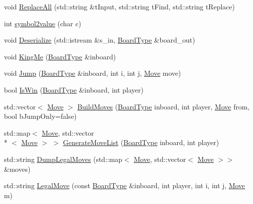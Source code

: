 \begin{DoxyCompactItemize}
\item 
void \hyperlink{structCheckers_1_1CheckersGame_a2c9facec3391246b7e501a5d8f960a5e}{Replace\-All} (std\-::string \&t\-Input, std\-::string t\-Find, std\-::string t\-Replace)
\item 
int \hyperlink{structCheckers_1_1CheckersGame_ac7e50da5e0c82db0cf66798587824aef}{symbol2value} (char c)
\item 
void \hyperlink{structCheckers_1_1CheckersGame_a9306065f944c32286cce8ad89e1d78d4}{Deserialize} (std\-::istream \&s\-\_\-in, \hyperlink{structCheckers_1_1BoardType}{Board\-Type} \&board\-\_\-out)
\item 
void \hyperlink{structCheckers_1_1CheckersGame_a9b9b1a25e9f43350f2e770152c7e290c}{King\-Me} (\hyperlink{structCheckers_1_1BoardType}{Board\-Type} \&inboard)
\item 
void \hyperlink{structCheckers_1_1CheckersGame_a4dbc105abdef75398282e442a453e31d}{Jump} (\hyperlink{structCheckers_1_1BoardType}{Board\-Type} \&inboard, int i, int j, \hyperlink{structCheckers_1_1Move}{Move} move)
\item 
bool \hyperlink{structCheckers_1_1CheckersGame_aca523dc54c4af9dfef6a31a19166c4f4}{Is\-Win} (\hyperlink{structCheckers_1_1BoardType}{Board\-Type} \&inboard, int player)
\item 
std\-::vector$<$ \hyperlink{structCheckers_1_1Move}{Move} $>$ \hyperlink{structCheckers_1_1CheckersGame_a67af8e930e5205365c44ad71f76bd2fb}{Build\-Moves} (\hyperlink{structCheckers_1_1BoardType}{Board\-Type} inboard, int player, \hyperlink{structCheckers_1_1Move}{Move} from, bool b\-Jump\-Only=false)
\item 
std\-::map$<$ \hyperlink{structCheckers_1_1Move}{Move}, std\-::vector\\*
$<$ \hyperlink{structCheckers_1_1Move}{Move} $>$ $>$ \hyperlink{structCheckers_1_1CheckersGame_a5bdb491d308a93ae937326d28392f983}{Generate\-Move\-List} (\hyperlink{structCheckers_1_1BoardType}{Board\-Type} inboard, int player)
\item 
std\-::string \hyperlink{structCheckers_1_1CheckersGame_ac69950852aaabffe3638fdf3de439b99}{Dump\-Legal\-Moves} (std\-::map$<$ \hyperlink{structCheckers_1_1Move}{Move}, std\-::vector$<$ \hyperlink{structCheckers_1_1Move}{Move} $>$$>$ \&moves)
\item 
std\-::string \hyperlink{structCheckers_1_1CheckersGame_a0148fb411c8dfa43ba80d78325d9e438}{Legal\-Move} (const \hyperlink{structCheckers_1_1BoardType}{Board\-Type} \&inboard, int player, int i, int j, \hyperlink{structCheckers_1_1Move}{Move} m)
$$
\end{DoxyCompactItemize}
